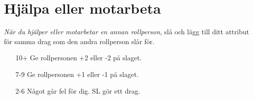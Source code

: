 \section{Hjälpa eller motarbeta}
\textit{När du hjälper eller motarbetar en annan rollperson}, slå och lägg till ditt attribut för samma drag som den andra rollperson slår för.
\begin{itemize}
  \item[10+] Ge rollpersonen +2 eller -2 på slaget.
  \item[7-9] Ge rollpersonen +1 eller -1 på slaget.
  \item[2-6] Något går fel för dig. SL gör ett drag.
\end{itemize}
